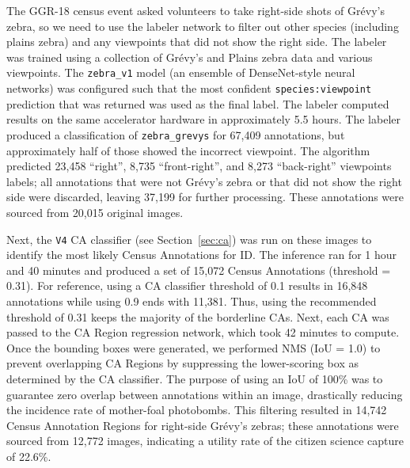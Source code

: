 The GGR-18 census event asked volunteers to take right-side shots of Gr\'evy's zebra, so we need to use the labeler network to filter out other species (including plains zebra) and any viewpoints that did not show the right side.  The labeler was trained using a collection of Gr\'evy's and Plains zebra data and various viewpoints.  The \texttt{zebra\_v1} model (an ensemble of DenseNet-style neural networks) was configured such that the most confident \texttt{species:viewpoint} prediction that was returned was used as the final label.  The labeler computed results on the same accelerator hardware in approximately 5.5 hours.  The labeler produced a classification of \texttt{zebra\_grevys} for 67,409 annotations, but approximately half of those showed the incorrect viewpoint.  The algorithm predicted 23,458 ``right'', 8,735 ``front-right'', and 8,273 ``back-right'' viewpoints labels; all annotations that were not Gr\'evy's zebra or that did not show the right side were discarded, leaving 37,199 for further processing.  These annotations were sourced from 20,015 original images.

Next, the \texttt{V4} CA classifier (see Section~\ref{sec:ca}) was run on these images to identify the most likely Census Annotations for ID.  The inference ran for 1 hour and 40 minutes and produced a set of 15,072 Census Annotations (threshold = 0.31).  For reference, using a CA classifier threshold of 0.1 results in 16,848 annotations while using 0.9 ends with 11,381. Thus, using the recommended threshold of 0.31 keeps the majority of the borderline CAs. Next, each CA was passed to the CA Region regression network, which took 42 minutes to compute.  Once the bounding boxes were generated, we performed NMS (IoU = 1.0) to prevent overlapping CA Regions by suppressing the lower-scoring box as determined by the CA classifier.  The purpose of using an IoU of 100\% was to guarantee zero overlap between annotations within an image, drastically reducing the incidence rate of mother-foal photobombs.  This filtering resulted in 14,742 Census Annotation Regions for right-side Gr\'evy's zebras; these annotations were sourced from 12,772 images, indicating a utility rate of the citizen science capture of 22.6\%.

